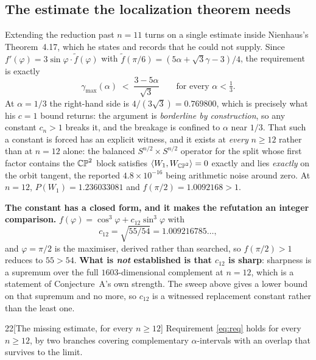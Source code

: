 \subsection{The estimate the localization theorem needs}

Extending the reduction past $n=11$ turns on a single estimate inside Nienhaus's Theorem~4.17, which he states and records that he could not supply. Since $f'(\varphi)=3\sin\varphi\cdot\tilde f(\varphi)$ with $\tilde f(\pi/6)=(5\alpha+\sqrt3\gamma-3)/4$, the requirement is exactly
\begin{equation}\label{eq:req}
\gamma_{\max}(\alpha)\;<\;\frac{3-5\alpha}{\sqrt3}\qquad\text{for every }\alpha<\tfrac13 .
\end{equation}
At $\alpha=1/3$ the right-hand side is $4/(3\sqrt3)=0.769800$, which is precisely what his $c=1$ bound returns: the argument is \emph{borderline by construction}, so any constant $c_n>1$ breaks it, and the breakage is confined to $\alpha$ near $1/3$. That such a constant is forced has an explicit witness, and it exists at \emph{every} $n\ge12$ rather than at $n=12$ alone: the balanced $S^{n/2}\times S^{n/2}$ operator for the split whose first factor contains the $\mathbb{CP}^2$ block satisfies $\langle W_1,W_{\mathbb{CP}^2}\rangle=0$ exactly and lies \emph{exactly} on the orbit tangent, the reported $4.8\times10^{-16}$ being arithmetic noise around zero. At $n=12$, $P(W_1)=1.236033081$ and $f(\pi/2)=1.0092168>1$.

\textbf{The constant has a closed form, and it makes the refutation an integer comparison.} $f(\varphi)=\cos^3\varphi+c_{12}\sin^3\varphi$ with
\[
c_{12}=\sqrt{55/54}=1.009216785\ldots,
\]
and $\varphi=\pi/2$ is the maximiser, derived rather than searched, so $f(\pi/2)>1$ reduces to $55>54$. \textbf{What is \emph{not} established is that $c_{12}$ is sharp}: sharpness is a supremum over the full $1603$-dimensional complement at $n=12$, which is a statement of Conjecture~A's own strength. The sweep above gives a lower bound on that supremum and no more, so $c_{12}$ is a witnessed replacement constant rather than the least one.

\begin{Lem}{22}[The missing estimate, for every $n\ge12$]
Requirement \eqref{eq:req} holds for every $n\ge12$, by two branches covering complementary $\alpha$-intervals with an overlap that survives to the limit.
\end{Lem}

